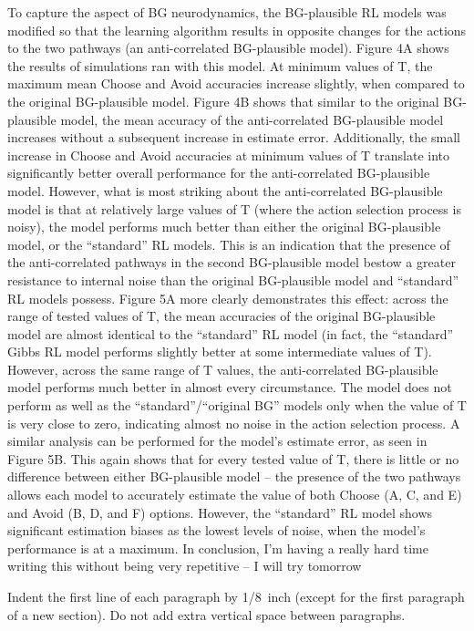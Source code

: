 \documentclass[10pt,letterpaper]{article}
\begin{document}
	
To capture the aspect of BG neurodynamics, the BG-plausible RL models was modified so that the learning algorithm results in opposite changes for the actions to the two pathways (an anti-correlated BG-plausible model). Figure 4A shows the results of simulations ran with this model. At minimum values of T, the maximum mean Choose and Avoid accuracies increase slightly, when compared to the original BG-plausible model. Figure 4B shows that similar to the original BG-plausible model, the mean accuracy of the anti-correlated BG-plausible model increases without a subsequent increase in estimate error. Additionally, the small increase in Choose and Avoid accuracies at minimum values of T translate into significantly better overall performance for the anti-correlated BG-plausible model. 
However, what is most striking about the anti-correlated BG-plausible model is that at relatively large values of T (where the action selection process is noisy), the model performs much better than either the original BG-plausible model, or the “standard” RL models. This is an indication that the presence of the anti-correlated pathways in the second BG-plausible model bestow a greater resistance to internal noise than the original BG-plausible model and “standard” RL models possess. Figure 5A more clearly demonstrates this effect: across the range of tested values of T, the mean accuracies of the original BG-plausible model are almost identical to the “standard” RL model (in fact, the “standard” Gibbs RL model performs slightly better at some intermediate values of T). However, across the same range of T values, the anti-correlated BG-plausible model performs much better in almost every circumstance. The model does not perform as well as the “standard”/“original BG” models only when the value of T is very close to zero, indicating almost no noise in the action selection process. A similar analysis can be performed for the model’s estimate error, as seen in Figure 5B. This again shows that for every tested value of T, there is little or no difference between either BG-plausible model – the presence of the two pathways allows each model to accurately estimate the value of both Choose (A, C, and E) and Avoid (B, D, and F) options. However, the “standard” RL model shows significant estimation biases as the lowest levels of noise, when the model’s performance is at a maximum.
	In conclusion, I’m having a really hard time writing this without being very repetitive – I will try tomorrow

Indent the first line of each paragraph by 1/8~inch (except for the
first paragraph of a new section). Do not add extra vertical space
between paragraphs.
\end{document}
